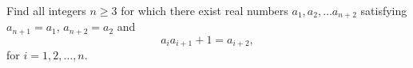 Find all integers $n \geq 3$ for which there exist real numbers $a_1, a_2, \dots a_{n + 2}$ satisfying $a_{n + 1} = a_1$, $a_{n + 2} = a_2$ and$$a_ia_{i + 1} + 1 = a_{i + 2},$$for $i = 1, 2, \dots, n$.